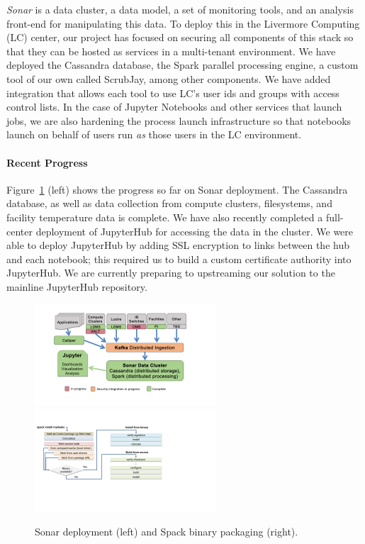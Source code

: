 {\it Sonar} is a data cluster, a data model, a set of monitoring tools,
and an analysis front-end for manipulating this data. To deploy this in
the Livermore Computing (LC) center, our project has focused on securing
all components of this stack so that they can be hosted as services in a
multi-tenant environment. We have deployed the Cassandra database, the
Spark parallel processing engine, a custom tool of our own called
ScrubJay, among other components. We have added integration that allows
each tool to use LC's user ids and groups with access control lists. In
the case of Jupyter Notebooks and other services that launch jobs, we are
also hardening the process launch infrastructure so that notebooks launch
on behalf of users run {\it as} those users in the LC environment.

\paragraph{Recent Progress}
Figure~\ref{fig:sonar-spack} (left) shows the progress so far on Sonar
deployment.  The Cassandra database, as well as data collection from
compute clusters, filesystems, and facility temperature data is complete.
We have also recently completed a full-center deployment of JupyterHub
for accessing the data in the cluster. We were able to deploy JupyterHub
by adding SSL encryption to links between the hub and each notebook; this
required us to build a custom certificate authority into JupyterHub.  We
are currently preparing to upstreaming our solution to the mainline
JupyterHub repository.
\begin{figure}[htb]
    \centering
    \includegraphics[height=1.5in]{projects/2.3.5-Ecosystem/2.3.5.03-LLNL-ATDM-Ecosystem/sonar}~~~~~~~
    \includegraphics[height=1.5in]{projects/2.3.5-Ecosystem/2.3.5.03-LLNL-ATDM-Ecosystem/spack-fetch}
    \caption{
        \label{fig:sonar-spack} Sonar deployment (left) and
        Spack binary packaging (right).
    }
\end{figure}

